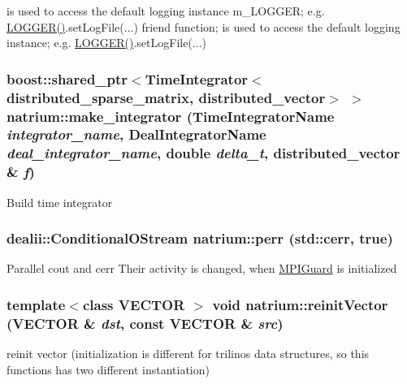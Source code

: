 is used to access the default logging instance m\_\-LOGGER; e.g. \hyperlink{namespacenatrium_a0d879cf404d8a12fc978ab97d33758b4}{LOGGER()}.setLogFile(...) friend function; is used to access the default logging instance; e.g. \hyperlink{namespacenatrium_a0d879cf404d8a12fc978ab97d33758b4}{LOGGER()}.setLogFile(...) \hypertarget{namespacenatrium_aaa8bf70405092ec81a8b15331a8f24b5}{
\subsubsection[{make\_\-integrator}]{\setlength{\rightskip}{0pt plus 5cm}boost::shared\_\-ptr$<${\bf TimeIntegrator}$<${\bf distributed\_\-sparse\_\-matrix}, {\bf distributed\_\-vector}$>$ $>$ natrium::make\_\-integrator (TimeIntegratorName {\em integrator\_\-name}, \/  DealIntegratorName {\em deal\_\-integrator\_\-name}, \/  double {\em delta\_\-t}, \/  distributed\_\-vector \& {\em f})}}
\label{namespacenatrium_aaa8bf70405092ec81a8b15331a8f24b5}


Build time integrator \hypertarget{namespacenatrium_a5493e61c5fe1935bc9975d78a24dceda}{
\subsubsection[{perr}]{\setlength{\rightskip}{0pt plus 5cm}dealii::ConditionalOStream {\bf natrium::perr} (std::cerr, \/  true)}}
\label{namespacenatrium_a5493e61c5fe1935bc9975d78a24dceda}
Parallel cout and cerr Their activity is changed, when \hyperlink{classnatrium_1_1MPIGuard}{MPIGuard} is initialized \hypertarget{namespacenatrium_a95eedd6a35d489da1b939928d8cf40e0}{
\subsubsection[{reinitVector}]{\setlength{\rightskip}{0pt plus 5cm}template$<$class VECTOR $>$ void natrium::reinitVector (VECTOR \& {\em dst}, \/  const VECTOR \& {\em src})}}
\label{namespacenatrium_a95eedd6a35d489da1b939928d8cf40e0}
reinit vector (initialization is different for trilinos data structures, so this functions has two different instantiation) 


